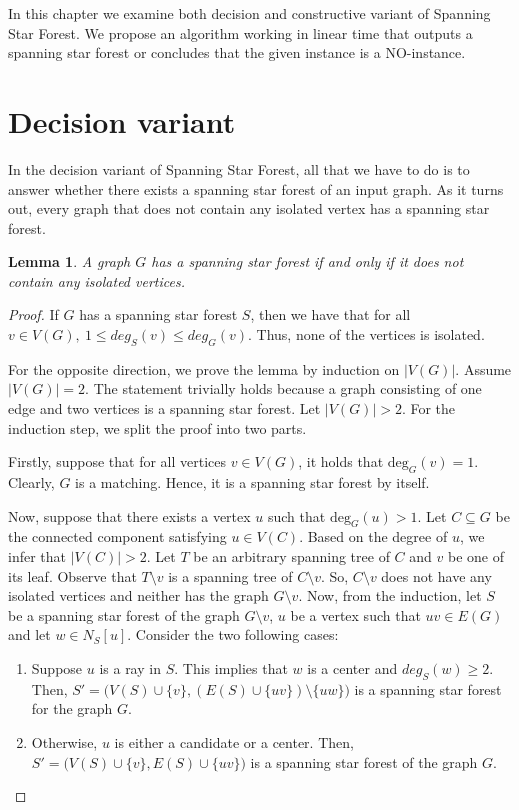 \documentclass[en]{pracamgr}
\newtheorem{lemma}{Lemma}
\theoremstyle{definition}
\newcommand{\ssf}{spanning star forest}
\newcommand{\ssfp}{{\sc Spanning Star Forest}}
\newcommand{\degree}[2]{\textrm{deg}_{#1}(#2)}
\begin{document}
In this chapter we examine both decision and constructive variant of \ssfp{}. We propose an algorithm working in linear time that outputs a \ssf{} or concludes that the given instance is a NO-instance.

\section{Decision variant}

In the decision variant of \ssfp{}, all that we have to do is to answer whether there exists a spanning star forest of an input graph. As it turns out, every graph that does not contain any isolated vertex has a \ssf{}.

\begin{lemma}\label{SSF lemma}
 A graph $G$ has a \ssf{} if and only if it does not contain any isolated vertices.
\end{lemma}

\begin{proof}
	If $G$ has a \ssf{} $S$, then we have that for all $v \in V(G),\ 1 \leq deg_S(v) \leq deg_G(v)$. Thus, none of the vertices is isolated.
	
	For the opposite direction, we prove the lemma by induction on $|V(G)|$. Assume $|V(G)|=2$. The statement trivially holds because a graph consisting of one edge and two vertices is a \ssf{}. Let $|V(G)| >2$. For the induction step, we split the proof into two parts. 
	
	Firstly, suppose that for all vertices $v \in V(G)$, it holds that $\degree{G}{v}=1$.  Clearly, $G$ is a matching. Hence, it is a \ssf{} by itself. 
	
	Now, suppose that there exists a vertex $u$ such that $\degree{G}{u}>1$. Let $C \subseteq G$ be the connected component satisfying $u \in V(C)$. Based on the degree of $u$, we infer that $|V(C)|>2$. Let $T$ be an arbitrary spanning tree of $C$ and $v$ be one of its leaf. Observe that $T \setminus v$ is a spanning tree of $C \setminus v$. So, $C \setminus v$ does not have any isolated vertices and neither has the graph $G \setminus v$. Now, from the induction, let $S$ be a \ssf{} of the graph $G \setminus v$, $u$ be a vertex such that $uv \in E(G)$ and let $w \in N_S[u]$. Consider the two following cases:
	\begin{enumerate}
		\item Suppose $u$ is a ray in $S$. This implies that $w$ is a center and $deg_S(w) \geq 2$. Then, $S'=\big(V(S) \cup \{v\},(E(S) \cup \{uv\}) \setminus \{uw\}\big)$ is a spanning star forest for the graph $G$.
		\item Otherwise, $u$ is either a candidate or a center. Then, $S'=\big(V(S) \cup \{v\}, E(S) \cup \{uv\}\big)$ is a spanning star forest of the graph $G$. \qedhere
	\end{enumerate}
	
\end{proof}
\end{document}
